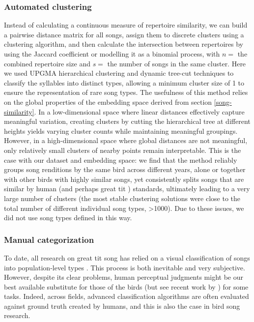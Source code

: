 \subsubsection{Automated clustering}

Instead of calculating a continuous measure of repertoire similarity, we can build a pairwise distance matrix for all songs, assign them to discrete clusters using a clustering algorithm, and then calculate the intersection between repertoires by using the Jaccard coefficient or modelling it as a binomial process, with $n = $ the combined repertoire size and $s = $ the number of songs in the same cluster. Here we used UPGMA hierarchical clustering and dynamic tree-cut techniques to classify the syllables into distinct types, allowing a minimum cluster size of 1 to ensure the representation of rare song types. The usefulness of this method relies on the global properties of the embedding space derived from section \ref{song-similarity}. In a low-dimensional space where linear distances effectively capture meaningful variation, creating clusters by cutting the hierarchical tree at different heights yields varying cluster counts while maintaining meaningful groupings. However, in a high-dimensional space where global distances are not meaningful, only relatively small clusters of nearby points remain interpretable. This is the case with our dataset and embedding space: we find that the method reliably groups song renditions by the same bird across different years, alone or together with other birds with highly similar songs, yet consistently splits songs that are similar by human (and perhaps great tit \parencite{falls1982}) standards, ultimately leading to a very large number of clusters (the most stable clustering solutions were close to the total number of different individual song types, >1000). Due to these issues, we did not use song types defined in this way.

\subsubsection{Manual categorization}

To date, all research on great tit song has relied on a visual classification of songs into population-level types \parencite{baker1987, falls1982, fayet2014, hutfluss2022, mcgregor1982, mcgregor1981, mcgregor1982b}. This process is both inevitable and very subjective. However, despite its clear problems, human perceptual judgments might be our best available substitute for those of the birds (but see recent work by \cite{morfi2021, zandberg2022}) for some tasks. Indeed, across fields, advanced classification algorithms are often evaluated against ground truth created by humans, and this is also the case in bird song research.

